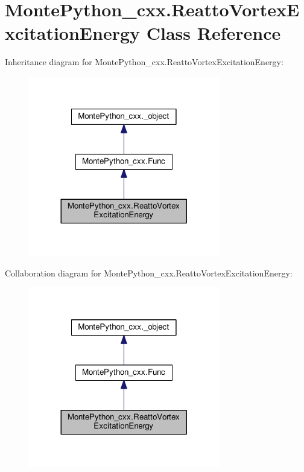 \hypertarget{classMontePython__cxx_1_1ReattoVortexExcitationEnergy}{}\section{Monte\+Python\+\_\+cxx.\+Reatto\+Vortex\+Excitation\+Energy Class Reference}
\label{classMontePython__cxx_1_1ReattoVortexExcitationEnergy}


Inheritance diagram for Monte\+Python\+\_\+cxx.\+Reatto\+Vortex\+Excitation\+Energy\+:
\nopagebreak
\begin{figure}[H]
\begin{center}
\leavevmode
\includegraphics[width=236pt]{classMontePython__cxx_1_1ReattoVortexExcitationEnergy__inherit__graph}
\end{center}
\end{figure}


Collaboration diagram for Monte\+Python\+\_\+cxx.\+Reatto\+Vortex\+Excitation\+Energy\+:
\nopagebreak
\begin{figure}[H]
\begin{center}
\leavevmode
\includegraphics[width=236pt]{classMontePython__cxx_1_1ReattoVortexExcitationEnergy__coll__graph}
\end{center}
\end{figure}
